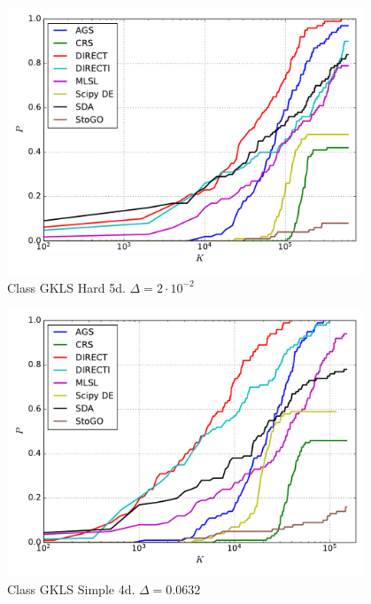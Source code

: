 \documentclass[a4paper]{article}
\begin{document}
\begin{figure}[H]
  \center
  \includegraphics[width=0.95\textwidth]{../experiments/gklsh5d/cmc.pdf}
  \caption{Class GKLS Hard 5d. $\Delta=2\cdot10^{-2}$}
\end{figure}


\begin{figure}[H]
  \center
  \includegraphics[width=0.95\textwidth]{../experiments/gklss4d/cmc.pdf}
  \caption{Class GKLS Simple 4d. $\Delta=0.0632$}
\end{figure}

\end{document}
